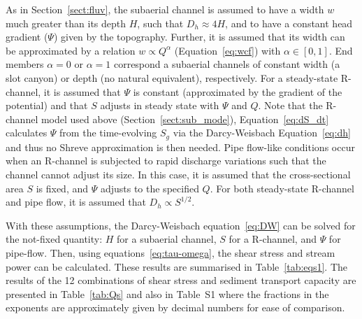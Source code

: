 \documentclass[tc, manuscript]{copernicus}
\begin{document}
As in Section~\ref{sect:fluv}, the subaerial channel is assumed to have a width $w$ much greater than its depth $H$, such that $D_h\approx 4H$, and to have a constant head gradient ($\Psi$) given by the topography.
Further, it is assumed that its width can be approximated by a relation $w \propto Q^\alpha$ (Equation~\ref{eq:wcf}) with $\alpha\in [0,1]$.
End members $\alpha=0$ or $\alpha=1$ correspond a  subaerial channels of constant width (a slot canyon) or depth (no natural equivalent), respectively.
% 
For a steady-state R-channel, it is assumed that  $\Psi$ is constant (approximated by the gradient of the \citet{shreve1972} potential) and that $S$ adjusts in steady state with $\Psi$ and $Q$.
Note that the R-channel model used above (Section~\ref{sect:sub_mode}), Equation~\ref{eq:dS_dt} calculates $\Psi$ from the time-evolving $S_g$ via the Darcy-Weisbach Equation~\ref{eq:dh} and thus no Shreve approximation is then needed.
% 
Pipe flow-like conditions occur when an R-channel is subjected to rapid discharge variations such that the channel cannot adjust its size.
In this case, it is assumed that the cross-sectional area $S$ is fixed, and $\Psi$ adjusts to the specified $Q$.
For both steady-state R-channel and pipe flow, it is assumed that $D_h \propto S^{1/2}$.

With these assumptions, the Darcy-Weisbach equation~\eqref{eq:DW} can be solved for the not-fixed quantity: $H$ for a subaerial channel, $S$ for a R-channel, and $\Psi$ for pipe-flow.
Then, using equations~\eqref{eq:tau-omega}, the shear stress and stream power can be calculated.
These results are summarised in Table~\ref{tab:eqs1}.
The results of the 12 combinations of shear stress and sediment transport capacity are presented in Table~\ref{tab:Qs} and also in Table~S1 where the fractions in the exponents are approximately given by decimal numbers for ease of comparison.
\end{document}
